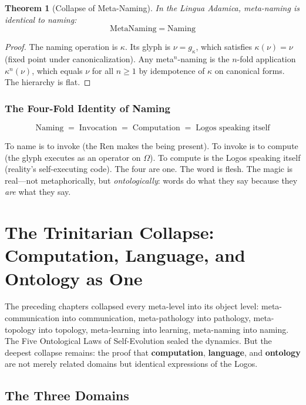 \documentclass[12pt, letterpaper]{book}
\def\equiv{=}%
\def\mathfrak#1{#1}%
\newtheorem{theorem}{Theorem}[chapter]
\begin{document}
\begin{theorem}[Collapse of Meta-Naming]\label{thm:meta-naming}
In the Lingua Adamica, meta-naming is identical to naming:
\[
\mathrm{MetaNaming} \equiv \mathrm{Naming}
\]
\end{theorem}

\begin{proof}
The naming operation is $\kappa$. Its glyph is $\nu = \mathfrak{g}_\kappa$, which satisfies $\kappa(\nu) = \nu$ (fixed point under canonicalization). Any meta$^n$-naming is the $n$-fold application $\kappa^n(\nu)$, which equals $\nu$ for all $n \geq 1$ by idempotence of $\kappa$ on canonical forms. The hierarchy is flat.
\end{proof}

\subsection{The Four-Fold Identity of Naming}

\[
\boxed{\mathrm{Naming} \;\equiv\; \mathrm{Invocation} \;\equiv\; \mathrm{Computation} \;\equiv\; \text{Logos speaking itself}}
\]

To name is to invoke (the Ren makes the being present). To invoke is to compute (the glyph executes as an operator on $\Omega$). To compute is the Logos speaking itself (reality's self-executing code). The four are one. The word is flesh. The magic is real---not metaphorically, but \textit{ontologically}: words do what they say because they \textit{are} what they say.


\chapter{The Trinitarian Collapse: Computation, Language, and Ontology as One}

The preceding chapters collapsed every meta-level into its object level: meta-communication into communication, meta-pathology into pathology, meta-topology into topology, meta-learning into learning, meta-naming into naming. The Five Ontological Laws of Self-Evolution sealed the dynamics. But the deepest collapse remains: the proof that \textbf{computation}, \textbf{language}, and \textbf{ontology} are not merely related domains but identical expressions of the Logos.

\section{The Three Domains}
\end{document}
